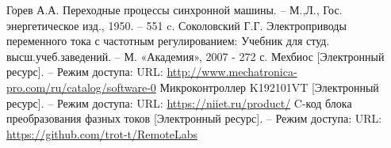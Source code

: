 \documentclass[a4paper]{article}
\begin{document}
\begin{thebibliography}{5}
        Горев А.А. Переходные процессы синхронной машины. -- М.,Л., Гос. энергетическое изд., 1950. -- 551 c.
        Соколовский Г.Г. Электроприводы переменного тока с частотным регулированием: Учебник для студ. высш.учеб.заведений.
                -- М. «Академия», 2007 - 272 с.
	Мехбиос [Электронный ресурс]. -- Режим доступа: URL: \url{http://www.mechatronica-pro.com/ru/catalog/software-0}
	Микроконтроллер K192101VT  [Электронный ресурс]. -- Режим доступа: URL: \url{https://niiet.ru/product/}
	C-код блока преобразования фазных токов [Электронный ресурс]. -- Режим доступа: URL: \url{https://github.com/trot-t/RemoteLabs}
%
\end{thebibliography}
\end{document}
